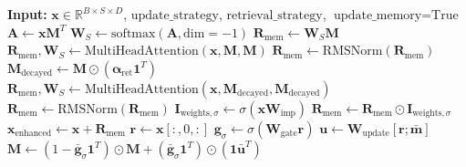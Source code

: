 \documentclass{article}
\begin{document}
\begin{algorithm}
\caption{WorkingMemory with Vectorized Updates and Retrieval}
\begin{algorithmic}[1]
\STATE \textbf{Input:} $\mathbf{x} \in \mathbb{R}^{B \times S \times D}$, $\text{update\_strategy}$, $\text{retrieval\_strategy}$, $\text{update\_memory} = \text{True}$
    \STATE $\mathbf{A} \leftarrow \mathbf{x} \mathbf{M}^T$ 
    \STATE $\mathbf{W}_S \leftarrow \text{softmax}(\mathbf{A}, \text{dim}=-1)$ 
    \STATE $\mathbf{R}_{\text{mem}} \leftarrow \mathbf{W}_S \mathbf{M}$ 
    \STATE $\mathbf{R}_{\text{mem}}, \mathbf{W}_S \leftarrow \text{MultiHeadAttention}(\mathbf{x}, \mathbf{M}, \mathbf{M})$ 
    \STATE $\mathbf{R}_{\text{mem}} \leftarrow \text{RMSNorm}(\mathbf{R}_{\text{mem}})$ 
    \STATE $\mathbf{M}_{\text{decayed}} \leftarrow \mathbf{M} \odot (\boldsymbol{\alpha}_{\text{ret}} \mathbf{1}^T)$ 
    \STATE $\mathbf{R}_{\text{mem}}, \mathbf{W}_S \leftarrow \text{MultiHeadAttention}(\mathbf{x}, \mathbf{M}_{\text{decayed}}, \mathbf{M}_{\text{decayed}})$ 
    \STATE $\mathbf{R}_{\text{mem}} \leftarrow \text{RMSNorm}(\mathbf{R}_{\text{mem}})$ 
    \STATE $\mathbf{I}_{\text{weights},\sigma} \leftarrow \sigma(\mathbf{x} \mathbf{W}_{\text{imp}})$ 
    \STATE $\mathbf{R}_{\text{mem}} \leftarrow \mathbf{R}_{\text{mem}} \odot \mathbf{I}_{\text{weights},\sigma}$ 
\ENDIF
\STATE $\mathbf{x}_{\text{enhanced}} \leftarrow \mathbf{x} + \mathbf{R}_{\text{mem}}$ 
        \STATE $\mathbf{r} \leftarrow \mathbf{x}[:, 0, :]$ 
        \STATE $\mathbf{g}_\sigma \leftarrow \sigma(\mathbf{W}_{\text{gate}} \mathbf{r})$ 
        \STATE $\mathbf{u} \leftarrow \mathbf{W}_{\text{update}} [\mathbf{r}; \bar{\mathbf{m}}]$ 
        \STATE $\mathbf{M} \leftarrow (1 - \bar{\mathbf{g}}_\sigma \mathbf{1}^T) \odot \mathbf{M} + (\bar{\mathbf{g}}_\sigma \mathbf{1}^T) \odot (\mathbf{1} \bar{\mathbf{u}}^T)$ 

\end{algorithmic}
\end{algorithm}
\end{document}
